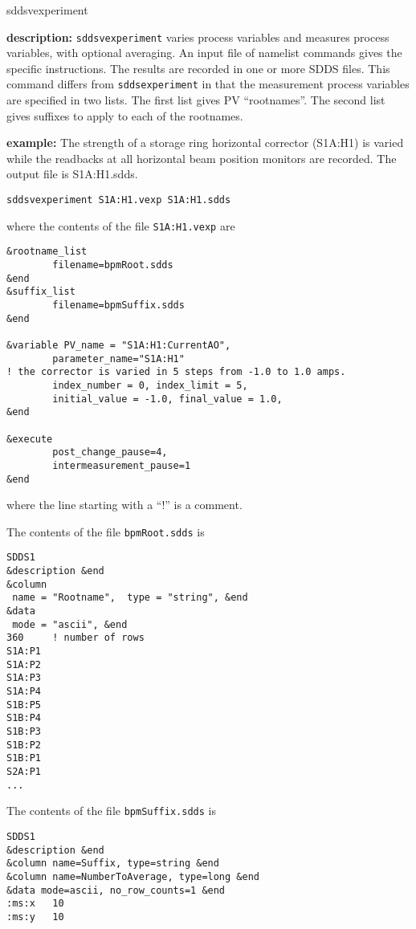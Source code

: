 \begin{sddsprog}{sddsvexperiment}
\item {\bf description:}
\verb+sddsvexperiment+ varies process variables and measures process variables, with optional averaging.
An input file of namelist commands gives the specific instructions.
The results are recorded in one or more SDDS files. This command differs from
\verb+sddsexperiment+ in that the measurement process variables are specified in two lists.  The first
list gives PV ``rootnames''.  The second list gives suffixes to apply to each of 
the rootnames.
\item {\bf example:} 
% 
The strength of a storage ring horizontal corrector (S1A:H1) is varied while the readbacks at all horizontal beam position
monitors are recorded. The output file is S1A:H1.sdds.
\begin{verbatim}
sddsvexperiment S1A:H1.vexp S1A:H1.sdds
\end{verbatim}

where the contents of the file \verb+S1A:H1.vexp+ are
\begin{verbatim}
&rootname_list 
        filename=bpmRoot.sdds
&end
&suffix_list 
        filename=bpmSuffix.sdds
&end

&variable PV_name = "S1A:H1:CurrentAO",
        parameter_name="S1A:H1"
! the corrector is varied in 5 steps from -1.0 to 1.0 amps.
        index_number = 0, index_limit = 5,
        initial_value = -1.0, final_value = 1.0,
&end
        
&execute
        post_change_pause=4,
        intermeasurement_pause=1
&end
\end{verbatim}
where the line starting with a ``!'' is a comment.

The contents of the file \verb+bpmRoot.sdds+ is
\begin{verbatim}
SDDS1
&description &end
&column
 name = "Rootname",  type = "string", &end
&data
 mode = "ascii", &end
360     ! number of rows
S1A:P1
S1A:P2
S1A:P3
S1A:P4
S1B:P5
S1B:P4
S1B:P3
S1B:P2
S1B:P1
S2A:P1  
...
\end{verbatim}
The contents of the file \verb+bpmSuffix.sdds+ is
\begin{verbatim}
SDDS1
&description &end
&column name=Suffix, type=string &end
&column name=NumberToAverage, type=long &end
&data mode=ascii, no_row_counts=1 &end
:ms:x   10
:ms:y   10
\end{verbatim}


\end{sddsprog}

